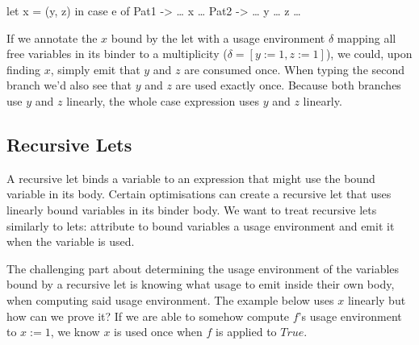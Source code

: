 \documentclass[]{lwnovathesis}
\begin{document}
\begin{code}
let x = (y, z) in
case e of
  Pat1 -> … x …
  Pat2 -> … y … z …
\end{code}

If we annotate the $x$ bound by the let with a usage environment $\delta$
mapping all free variables in its binder to a multiplicity ($\delta = [y := 1, z
:= 1]$), we could, upon finding $x$, simply emit that $y$ and $z$ are consumed
once. When typing the second branch we'd also see that $y$ and $z$ are used
exactly once. Because both branches use $y$ and $z$ linearly, the whole case
expression uses $y$ and $z$ linearly.





\subsection{Recursive Lets}

A recursive let binds a variable to an expression that might use the bound
variable in its body. Certain optimisations can create a recursive let that uses
linearly bound variables in its binder body. We want to treat recursive lets
similarly to lets: attribute to bound variables a usage environment and emit it
when the variable is used.

The challenging part about determining the usage environment of the variables bound
by a recursive let is knowing what usage to emit inside their own body, when
computing said usage environment. The example below uses $x$ linearly %
but how can we prove it? If we are able to somehow compute $f$'s usage
environment to $x := 1$, we know $x$ is used once when $f$ is applied to
$\mathit{True}$.
\end{document}
